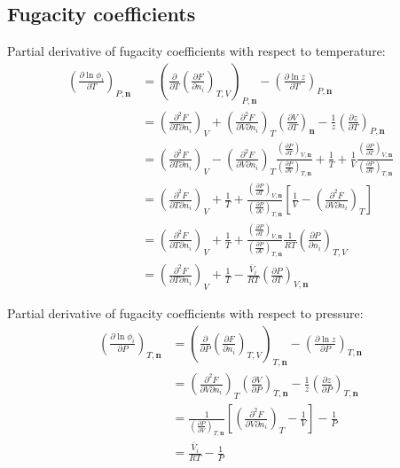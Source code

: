 \documentclass[internal,english]{sintefmemo2012}
\numberwithin{equation}{section}
\newcommand*{\pd}[2]{\frac{\partial #1}{\partial #2}}
\newcommand*{\pder}[2]{\left(\frac{\partial #1}{\partial #2}\right)}
\newcommand*{\pdcross}[3]{\left(\frac{\partial^2 #1}{\partial #2 \partial #3}\right)}
\begin{document}
\subsection{Fugacity coefficients}
Partial derivative of fugacity coefficients with respect to temperature:
\begin{equation}
\begin{split}
\pder{\ln \phi_i}{T}_{P, \textbf{n}} 
& = \left(\pd{}{T} \pder{F}{n_i}_{T,V} \right)_{P, \textbf{n}} - \pder{\ln z}{T}_{P,\textbf{n}} \\
& = \pdcross{F}{T}{n_i}_V + \pdcross{F}{V}{n_i}_{T} \pder{V}{T}_{\textbf{n}}- \frac{1}{z}\pder{z}{T}_{P, \textbf{n}} \\
& = \pdcross{F}{T}{n_i}_V - \pdcross{F}{V}{n_i}_{T} \frac{\pder{P}{T}_{V,\textbf{n}}}{\pder{P}{V}_{T,\textbf{n}}} + \frac{1}{T} + \frac{1}{V} \frac{\pder{P}{T}_{V,\textbf{n}}}{\pder{P}{V}_{T,\textbf{n}}} \\
& = \pdcross{F}{T}{n_i}_V + \frac{1}{T} + \frac{\pder{P}{T}_{V,\textbf{n}}}{\pder{P}{V}_{T,\textbf{n}}} \left[\frac{1}{V} - \pdcross{F}{V}{n_i}_{T} \right] \\
& = \pdcross{F}{T}{n_i}_V + \frac{1}{T} + \frac{\pder{P}{T}_{V,\textbf{n}}}{\pder{P}{V}_{T,\textbf{n}}} \frac{1}{RT} \pder{P}{n_i}_{T,V} \\
& = \pdcross{F}{T}{n_i}_V + \frac{1}{T} - \frac{\bar{V}_i}{RT}  \pder{P}{T}_{V,\textbf{n}} 
\end{split}
\end{equation}

Partial derivative of fugacity coefficients with respect to pressure:
\begin{equation}
\begin{split}
\pder{\ln \phi_i}{P}_{T, \textbf{n}} 
& = \left(\pd{}{P} \pder{F}{n_i}_{T,V} \right)_{T, \textbf{n}} - \pder{\ln z}{P}_{T,\textbf{n}} \\
& = \pdcross{F}{V}{n_i}_{T} \pder{V}{P}_{T, \textbf{n}} - \frac{1}{z} \pder{z}{P}_{T,\textbf{n}} \\
& = \frac{1}{\pder{P}{V}_{T,\textbf{n}}} \left[ \pdcross{F}{V}{n_i}_{T} - \frac{1}{V} \right] - \frac{1}{P} \\
& = \frac{\bar{V}_i}{RT} - \frac{1}{P} 
\end{split}
\end{equation}
\end{document}
